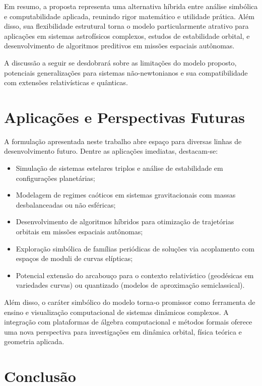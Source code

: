 \documentclass[12pt]{article}
\begin{document}
Em resumo, a proposta representa uma alternativa híbrida entre análise simbólica e computabilidade aplicada, reunindo rigor matemático e utilidade prática. Além disso, sua flexibilidade estrutural torna o modelo particularmente atrativo para aplicações em sistemas astrofísicos complexos, estudos de estabilidade orbital, e desenvolvimento de algoritmos preditivos em missões espaciais autônomas.

A discussão a seguir se desdobrará sobre as limitações do modelo proposto, potenciais generalizações para sistemas não-newtonianos e sua compatibilidade com extensões relativísticas e quânticas.

\section{Aplicações e Perspectivas Futuras}

A formulação apresentada neste trabalho abre espaço para diversas linhas de desenvolvimento futuro. Dentre as aplicações imediatas, destacam-se:

\begin{itemize}
    \item Simulação de sistemas estelares triplos e análise de estabilidade em configurações planetárias;
    \item Modelagem de regimes caóticos em sistemas gravitacionais com massas desbalanceadas ou não esféricas;
    \item Desenvolvimento de algoritmos híbridos para otimização de trajetórias orbitais em missões espaciais autônomas;
    \item Exploração simbólica de famílias periódicas de soluções via acoplamento com espaços de moduli de curvas elípticas;
    \item Potencial extensão do arcabouço para o contexto relativístico (geodésicas em variedades curvas) ou quantizado (modelos de aproximação semiclassical).
\end{itemize}

Além disso, o caráter simbólico do modelo torna-o promissor como ferramenta de ensino e visualização computacional de sistemas dinâmicos complexos. A integração com plataformas de álgebra computacional e métodos formais oferece uma nova perspectiva para investigações em dinâmica orbital, física teórica e geometria aplicada.


\section{Conclusão}
\end{document}
